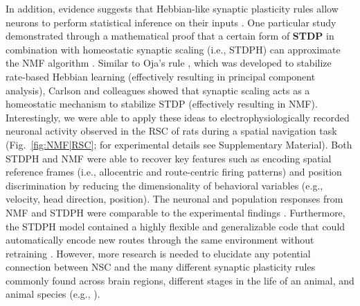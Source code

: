 In addition, evidence suggests that Hebbian-like synaptic plasticity rules
allow neurons to perform statistical inference on their inputs
\cite{Nessler2009,Carlson2013,MorenoBoteDrugowitsch2015,Oja1982}.
One particular study demonstrated through a mathematical proof
that a certain form of \textbf{\ac{STDP}} in combination with 
homeostatic synaptic scaling (i.e., \ac{STDPH})
can approximate the \ac{NMF} algorithm
\cite{Carlson2013}.
Similar to Oja's rule \cite{Oja1982}, which was developed to stabilize 
rate-based Hebbian learning
(effectively resulting in principal component analysis),
Carlson and colleagues showed that synaptic scaling acts as a 
homeostatic mechanism to stabilize \ac{STDP}
(effectively resulting in \ac{NMF}).
Interestingly, we were able to apply these ideas to 
electrophysiologically recorded neuronal activity observed in the \ac{RSC}
of rats during a spatial navigation task (Fig.~\ref{fig:NMF|RSC}; for experimental details see Supplementary Material). Both \ac{STDPH} and \ac{NMF} were able to recover key  features such as encoding spatial reference frames (i.e., allocentric and route-centric firing patterns) and position discrimination by reducing the dimensionality of behavioral variables (e.g., velocity, head direction, position).
The neuronal and population responses from NMF and STDPH were comparable to the experimental findings \cite{AlexanderNitz2015}.
Furthermore, the \ac{STDPH} model contained a highly flexible and generalizable code
that could automatically encode new routes through the same environment
without retraining \cite{Rounds2018}.
However, more research is needed to elucidate any potential connection 
between \ac{NSC} and the many different synaptic plasticity rules 
commonly found across brain regions,
different stages in the life of an animal, and animal species
(e.g., \cite{Froemke2010,BCM1982}).
